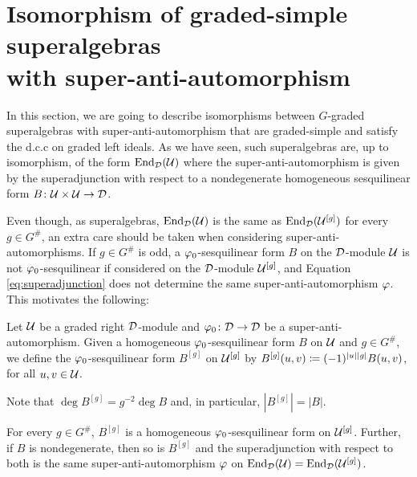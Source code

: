 \section{Isomorphism of graded-simple superalgebras\texorpdfstring{\\}{} with super-anti-automorphism}\label{sec:iso-vphi-abstract}

In this section, we are going to describe isomorphisms between $G$-graded superalgebras with super-anti-automorphism that are graded-simple and satisfy the d.c.c on graded left ideals.
As we have seen, such superalgebras are, up to isomorphism, of the form $\operatorname{End}_{\mathcal{D}} (\mathcal U)$ where the super-anti-automorphism is given by the superadjunction with respect to a nondegenerate homogeneous sesquilinear form $B\colon \mathcal U \times \mathcal U \to \mathcal{D}$.

Even though, as superalgebras, $\operatorname{End}_{\mathcal{D}}( \mathcal U )$ is the same as $\operatorname{End}_{\mathcal{D}}( \mathcal U^{[g]} )$ for every $g \in G^\#$, an extra care should be taken when considering super-anti-automorphisms.
If $g\in G^\#$ is odd, a $\varphi_0$-sesquilinear form $B$ on the $\mathcal{D}$-module $\mathcal U$ is not $\varphi_0$-sesquilinear if considered on the $\mathcal{D}$-module $\mathcal U^{[g]}$, and Equation \eqref{eq:superadjunction} does not determine the same super-anti-automorphism $\varphi$.
This motivates the following:

\begin{defi}\label{defi:shift-on-B}
	Let $\mathcal U$ be a graded right $\mathcal{D}$-module and $\varphi_0\colon \mathcal{D} \to \mathcal{D}$ be a super-anti-automorphism.
	Given a homogeneous $\varphi_0$-sesquilinear form $B$ on $\mathcal U$ and $g\in G^\#$, we define the $\varphi_0$-sesquilinear form  $B^{[g]}$ on $\mathcal U^{[g]}$ by $B^{[g]}(u,v) \coloneqq (-1)^{|u||g|} B(u,v)$, for all $u,v \in \mathcal U$.
\end{defi}

\begin{remark}\label{rmk:deg-B^[g]}
	Note that $\deg B^{[g]} = g^{-2} \deg B$ and, in particular, $|B^{[g]}| = |B|$.
\end{remark}

\begin{lemma}\label{lemma:B^[b]-does-the-job}
	For every $g\in G^\#$, $B^{[g]}$ is a homogeneous $\varphi_0$-sesquilinear form on $\mathcal U^{[g]}$.
	Further, if $B$ is nondegenerate, then so is $B^{[g]}$ and the superadjunction with respect to both is the same super-anti-automorphism $\varphi$ on $\operatorname{End}_{\mathcal{D}}(\mathcal U) = \operatorname{End}_{\mathcal{D}}(\mathcal U^{[g]})$.
\end{lemma}

